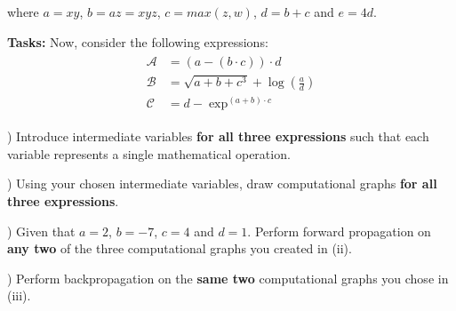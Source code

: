 \documentclass[DIN, pagenumber=false, fontsize=11pt, parskip=half]{scrartcl}
\newcommand{\mysubsection}[2]{\romannumeral #1) #2}
\begin{document}
\begin{figure}[h!]
\centering
{}
\end{figure}

where $a = xy$, $b = az = xyz$, $c = max(z, w)$, $d = b + c$ and $e = 4d$.

\textbf{Tasks:} Now, consider the following expressions:
\begin{align*}
\begin{split}
    \mathcal{A} &= (a - (b \cdot c)) \cdot d \\
    \mathcal{B} &= \sqrt{a + b + c^3} + \log(\frac{a}{d}) \\
    \mathcal{C} &= d - \exp^{(a + b) \cdot c}
\end{split}
\end{align*}

\mysubsection{1}{Introduce intermediate variables \textbf{for all three expressions} such that each variable represents a single mathematical operation.}

\mysubsection{2}{Using your chosen intermediate variables, draw computational graphs \textbf{for all three expressions}.}

\mysubsection{3}{Given that $a=2$, $b=-7$, $c=4$ and $d=1$. Perform forward propagation on \textbf{any two} of the three computational graphs you created in (ii).}

\mysubsection{4}{Perform backpropagation on the \textbf{same two} computational graphs you chose in (iii).}
\end{document}
